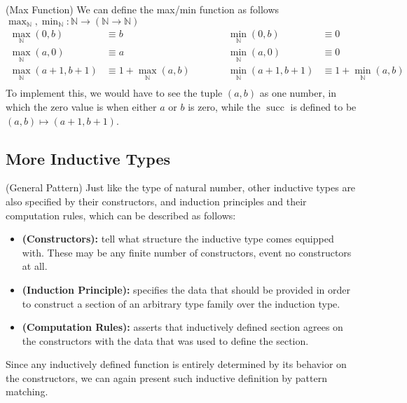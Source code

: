 \begin{remark}{(Max Function)}
    We can define the max/min function as follows $\max_\mathbb{N}, \min_\mathbb{N}:\mathbb{N}\to (\mathbb{N}\to \mathbb{N})$
    \begin{equation*}
    \begin{aligned}
        \operatorname{max}_\mathbb{N}(0, b) &\equiv b \\
        \operatorname{max}_\mathbb{N}(a, 0) &\equiv a \\
        \operatorname{max}_\mathbb{N}(a+1, b+1) &\equiv 1+\operatorname{max}_\mathbb{N}(a, b) \\
    \end{aligned} \qquad \quad
    \begin{aligned}
        \operatorname{min}_\mathbb{N}(0, b) &\equiv 0 \\
        \operatorname{min}_\mathbb{N}(a, 0) &\equiv 0 \\
        \operatorname{min}_\mathbb{N}(a+1, b+1) &\equiv 1+\operatorname{min}_\mathbb{N}(a, b) \\
    \end{aligned}
    \end{equation*}
    To implement this, we would have to see the tuple $(a, b)$ as one number, in which the zero value is when either $a$ or $b$ is zero, while the $\operatorname{succ}$ is defined to be $(a,b)\mapsto(a+1,b+1)$.
\end{remark}


\subsection{More Inductive Types}

\begin{remark}{(General Pattern)}
    Just like the type of natural number, other inductive types are also specified by their constructors, and induction principles and their computation rules, which can be described as follows:
    \begin{itemize}
        \item \textbf{(Constructors):} tell what structure the inductive type comes equipped with. These may be any finite number of constructors, event no constructors at all.
        \item \textbf{(Induction Principle):} specifies the data that should be provided in order to construct a section of an arbitrary type family over the induction type.
        \item \textbf{(Computation Rules):} asserts that inductively defined section agrees on the constructors with the data that was used to define the section.
    \end{itemize}
    Since any inductively defined function is entirely determined by its behavior on the constructors, we can again present such inductive definition by pattern matching.
\end{remark}

